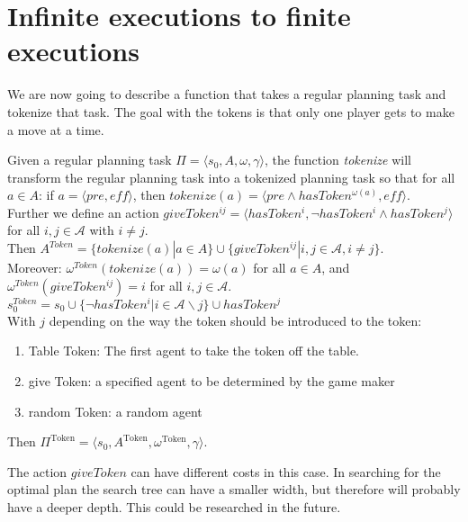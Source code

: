 \section{Infinite executions to finite executions}

We are now going to describe a function that takes a regular planning task and tokenize that task. The goal with the tokens is that only one player gets to make a move at a time.

Given a regular planning task $\Pi = \langle s_0, A, \omega, \gamma \rangle $, the function \textit{tokenize} will transform the regular planning task into a tokenized planning task so that for all $a \in A$:
 if $a = \langle pre, \textit{eff} \rangle$, then
   $tokenize(a) =\langle pre \wedge hasToken^{\omega(a)}, \textit{eff} \rangle$. \\
Further we define an action
    $ giveToken^{ij} = \langle hasToken^i, \neg hasToken^i \wedge hasToken^j \rangle $
    for all $i,j \in \mathcal{A}$ with $i \not = j$. \\
Then $ A^{Token}=\{tokenize(a)|a \in A\} \cup \{giveToken^{ij}|i,j \in \mathcal{A}, i \not = j\}$. \\
Moreover: $\omega^{Token}(tokenize(a))= \omega(a)$ for all $a \in A$,
and $\omega^{Token}(giveToken^{ij}) = i$ for all $i,j \in \mathcal{A}$. \\
$s_0^{Token} = s_0 \cup \{\neg hasToken^i|i \in \mathcal{A} \backslash j\} \cup hasToken^j$ \\
With $j$ depending on the way the token should be introduced to the token:
\begin{enumerate}
  \item Table Token:
    The first agent to take the token off the table.
  \item give Token:
    a specified agent to be determined by the game maker
  \item random Token:
    a random agent
\end{enumerate}



Then $ \Pi^{\text{Token}} = \langle s_0, A ^{\text{Token}}, \omega ^{\text{Token}}, \gamma \rangle $.

The action $giveToken$ can have different costs in this case. In searching for the optimal plan the search tree can have a smaller width, but therefore will probably have a deeper depth. This could be researched in the future. 


